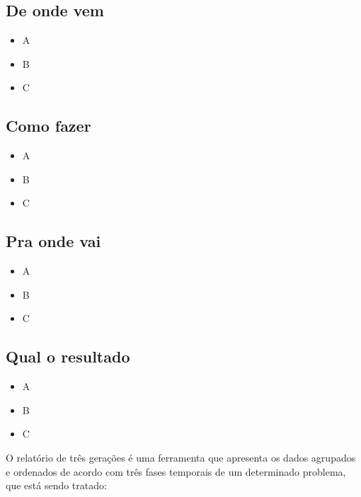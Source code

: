 \documentclass[
]{article}
\providecommand{\tightlist}{%
  \setlength{\itemsep}{0pt}\setlength{\parskip}{0pt}}
\begin{document}
\hypertarget{de-onde-vem-8}{%
\subsection*{De onde vem}\label{de-onde-vem-8}}

\begin{itemize}
\tightlist
\item
  A
\item
  B
\item
  C
\end{itemize}

\hypertarget{como-fazer-8}{%
\subsection*{Como fazer}\label{como-fazer-8}}

\begin{itemize}
\tightlist
\item
  A
\item
  B
\item
  C
\end{itemize}

\hypertarget{pra-onde-vai-8}{%
\subsection*{Pra onde vai}\label{pra-onde-vai-8}}

\begin{itemize}
\tightlist
\item
  A
\item
  B
\item
  C
\end{itemize}

\hypertarget{qual-o-resultado-8}{%
\subsection*{Qual o resultado}\label{qual-o-resultado-8}}

\begin{itemize}
\tightlist
\item
  A
\item
  B
\item
  C
\end{itemize}

O relatório de três gerações é uma ferramenta que apresenta os dados agrupados e ordenados de acordo com três fases temporais de um determinado problema, que está sendo tratado:
\end{document}
